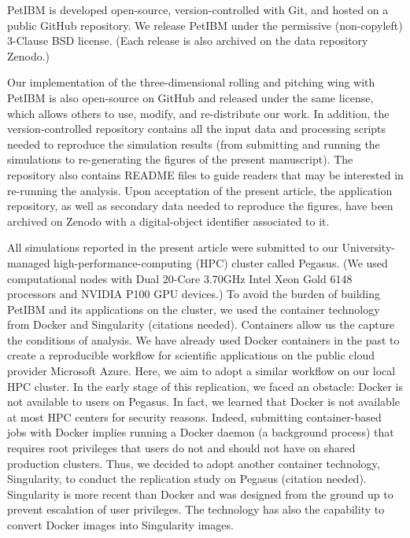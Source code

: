 PetIBM\supercite{chuang_et_al_2018} is developed open-source, version-controlled with Git, and hosted on a public GitHub repository.
We release PetIBM under the permissive (non-copyleft) 3-Clause BSD license.
(Each release is also archived on the data repository Zenodo.)

Our implementation of the three-dimensional rolling and pitching wing with PetIBM is also open-source on GitHub and released under the same license, which allows others to use, modify, and re-distribute our work.
In addition, the version-controlled repository contains all the input data and processing scripts needed to reproduce the simulation results (from submitting and running the simulations to re-generating the figures of the present manuscript).
The repository also contains \textsc{README} files to guide readers that may be interested in re-running the analysis.
Upon acceptation of the present article, the application repository, as well as secondary data needed to reproduce the figures, have been archived on Zenodo with a digital-object identifier associated to it.

All simulations reported in the present article were submitted to our University-managed high-performance-computing (HPC) cluster called Pegasus.
(We used computational nodes with Dual 20-Core 3.70GHz Intel Xeon Gold 6148 processors and NVIDIA P100 GPU devices.)
To avoid the burden of building PetIBM and its applications on the cluster, we used the container technology from Docker and Singularity (citations needed).
Containers allow us the capture the conditions of analysis.
We have already used Docker containers in the past to create a reproducible workflow for scientific applications on the public cloud provider Microsoft Azure.\supercite{mesnard_barba_2020}
Here, we aim to adopt a similar workflow on our local HPC cluster.
In the early stage of this replication, we faced an obstacle: Docker is not available to users on Pegasus.
In fact, we learned that Docker is not available at most HPC centers for security reasons.
Indeed, submitting container-based jobs with Docker implies running a Docker daemon (a background process) that requires root privileges that users do not and should not have on shared production clusters.
Thus, we decided to adopt another container technology, Singularity, to conduct the replication study on Pegasus (citation needed).
Singularity is more recent than Docker and was designed from the ground up to prevent escalation of user privileges.
The technology has also the capability to convert Docker images into Singularity images.

